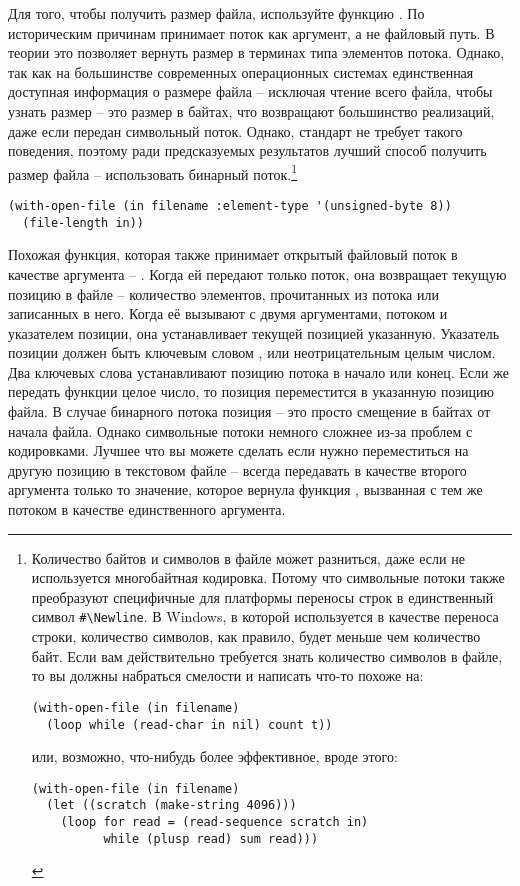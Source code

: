 Для того, чтобы получить размер файла, используйте функцию . По
историческим причинам  принимает поток как аргумент, а не файловый
путь. В теории это позволяет  вернуть размер в терминах типа элементов
потока. Однако, так как на большинстве современных операционных системах единственная
доступная информация о размере файла -- исключая чтение всего файла, чтобы узнать размер
-- это размер в байтах, что возвращают большинство реализаций, даже если
 передан символьный поток. Однако, стандарт не требует такого поведения,
поэтому ради предсказуемых результатов лучший способ получить размер файла -- использовать
бинарный поток.\footnote{Количество байтов и символов в файле может разниться, даже если
  не используется многобайтная кодировка. Потому что символьные потоки также преобразуют
  специфичные для платформы переносы строк в единственный символ \lstinline!#\Newline!. В
  Windows, в которой используется  в качестве переноса строки, количество
  символов, как правило, будет меньше чем количество байт. Если вам действительно
  требуется знать количество символов в файле, то вы должны набраться смелости и написать
  что-то похоже на:

\begin{lstlisting}
(with-open-file (in filename) 
  (loop while (read-char in nil) count t))
\end{lstlisting}

или, возможно, что-нибудь более эффективное, вроде этого:

\begin{lstlisting}
(with-open-file (in filename) 
  (let ((scratch (make-string 4096))) 
    (loop for read = (read-sequence scratch in) 
          while (plusp read) sum read)))
\end{lstlisting}
}

\begin{lstlisting}
(with-open-file (in filename :element-type '(unsigned-byte 8)) 
  (file-length in)) 
\end{lstlisting}

Похожая функция, которая также принимает открытый файловый поток в качестве аргумента --
. Когда ей передают только поток, она возвращает текущую позицию в
файле -- количество элементов, прочитанных из потока или записанных в него. Когда её
вызывают с двумя аргументами, потоком и указателем позиции, она устанавливает текущей
позицией указанную. Указатель позиции должен быть ключевым словом ,
 или неотрицательным целым числом. Два ключевых слова устанавливают позицию
потока в начало или конец. Если же передать функции целое число, то позиция переместится в
указанную позицию файла. В случае бинарного потока позиция -- это просто смещение в байтах
от начала файла. Однако символьные потоки немного сложнее из-за проблем с
кодировками. Лучшее что вы можете сделать если нужно переместиться на другую позицию в
текстовом файле -- всегда передавать  в качестве второго аргумента
только то значение, которое вернула функция , вызванная с тем же
потоком в качестве единственного аргумента.

